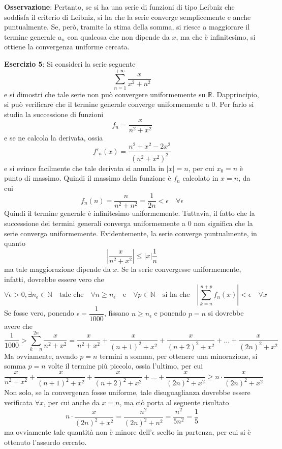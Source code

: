 \documentclass[a4paper]{extarticle}
\begin{document}
\vspace{2em}
\noindent
\textbf{Osservazione}: Pertanto, se si ha una serie di funzioni di tipo Leibniz che soddisfa il criterio di Leibniz, si ha che la serie converge semplicemente e anche puntualmente. Se, però, tramite la stima della somma, si riesce a maggiorare il termine generale $a_n$ con qualcosa che non dipende da $x$, ma che è infinitesimo, si ottiene la convergenza uniforme cercata.

\vspace{2em}
\noindent
\textbf{Esercizio 5}: Si consideri la serie seguente
\[\sum_{n=1}^{+\infty} \frac{x}{x^2+n^2}\]
e si dimostri che tale serie non può convergere uniformemente su $\mathbb{R}$. Dapprincipio, si può verificare che il termine generale converge uniformemente a $0$. Per farlo si studia la successione di funzioni
\[f_n = \frac{x}{n^2+x^2}\]
e se ne calcola la derivata, ossia
\[f'_n(x) = \frac{n^2 + x^2 - 2x^2}{(n^2+x^2)^2}\]
e si evince facilmente che tale derivata si annulla in $\vert x \vert = n$, per cui $x_0=n$ è punto di massimo. Quindi il massimo della funzione è $f_n$ calcolato in $x=n$, da cui
\[f_n(n)=\frac{n}{n^2+n^2} = \frac{1}{2n} < \epsilon \hspace{1em} \forall \epsilon\]
Quindi il termine generale è infinitesimo uniformemente. Tuttavia, il fatto che la successione dei termini generali converga uniformemente a $0$ non significa che la serie converga uniformemente. Evidentemente, la serie converge puntualmente, in quanto
\[\left \vert \frac{x}{n^2+x^2} \right \vert \leq \left \vert x \right \vert \frac{1}{n}\]
ma tale maggiorazione dipende da $x$. Se la serie convergesse uniformemente, infatti, dovrebbe essere vero che
\[\forall \epsilon > 0, \exists n_\epsilon \in \mathbb{N} \hspace{1em} \text{tale che} \hspace{1em} \forall n \geq n_\epsilon \hspace{1em} \text{e} \hspace{1em} \forall p \in \mathbb{N} \hspace{1em} \text{si ha che} \hspace{1em} \left \vert \sum_{k=n}^{n+p} f_n(x) \right \vert < \epsilon \hspace{1em} \forall x\]
Se fosse vero, ponendo $\epsilon=\dfrac{1}{1000}$, fissano $n \geq n_\epsilon$ e ponendo $p=n$ si dovrebbe avere che
\[\frac{1}{1000} > \sum_{k=n}^{2n} \frac{x}{n^2+x^2} = \frac{x}{n^2+x^2}+\frac{x}{(n+1)^2+x^2}+\frac{x}{(n+2)^2+x^2}+\dots+\frac{x}{(2n)^2+x^2}\]
Ma ovviamente, avendo $p=n$ termini a somma, per ottenere una minorazione, si somma $p=n$ volte il termine più piccolo, ossia l'ultimo, per cui
\[\frac{x}{n^2+x^2}+\frac{x}{(n+1)^2+x^2}+\frac{x}{(n+2)^2+x^2}+\dots+\frac{x}{(2n)^2+x^2} \geq n \cdot \dfrac{x}{(2n)^2+x^2}\]
Non solo, se la convergenza fosse uniforme, tale disuguaglianza dovrebbe essere verificata $\forall x$, per cui anche da $x=n$, ma ciò porta al seguente risultato
\[n \cdot \dfrac{x}{(2n)^2+x^2} = \frac{n^2}{(2n)^2 + n^2} = \frac{n^2}{5n^2} = \frac{1}{5}\]
ma ovviamente tale quantità non è minore dell'$\epsilon$ scelto in partenza, per cui si è ottenuto l'assurdo cercato.
\end{document}
